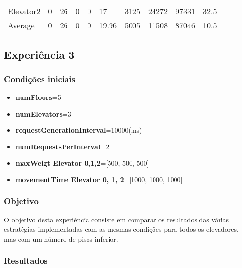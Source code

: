 \documentclass[a4paper]{article}
\begin{document}
\begin{table}[h]
\begin{tabular}{@{}llllllllll@{}}
Elevator2 & 0        & 26            & 0           & 0                                                               & 17                                                                  & 3125                                                         & 24272                                                 & 97331                                                   & 32.5         \\
Average   & 0     & 26         & 0        & 0                                                               & 19.96                                                               & 5005                                                         & 11508                                                 &  87046                                                  & 10.5         \\ \bottomrule
\end{tabular}
\end{table}

\subsection{Experiência 3}

\subsubsection{Condições iniciais}

\begin{itemize}
\item \textbf{numFloors}=5
\item \textbf{numElevators}=3
\item \textbf{requestGenerationInterval}=10000(ms)
\item \textbf{numRequestsPerInterval}=2
\item \textbf{maxWeigt Elevator 0,1,2}=[500, 500, 500]
\item \textbf{movementTime Elevator 0, 1, 2}=[1000, 1000, 1000]
\end{itemize}

\subsubsection{Objetivo} 

O objetivo desta experiência consiste em comparar os resultados das várias estratégias implementadas com as mesmas condições para todos os elevadores, mas com um número de pisos inferior.

\subsubsection{Resultados}
\end{document}
